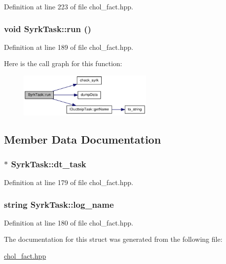 Definition at line 223 of file chol\_\-fact.hpp.\hypertarget{struct_syrk_task_af42d38cd71c443635346e4280b28c8c7}{
\subsubsection[{run}]{\setlength{\rightskip}{0pt plus 5cm}void SyrkTask::run ()}}
\label{struct_syrk_task_af42d38cd71c443635346e4280b28c8c7}


Definition at line 189 of file chol\_\-fact.hpp.

Here is the call graph for this function:\nopagebreak
\begin{figure}[H]
\begin{center}
\leavevmode
\includegraphics[width=186pt]{struct_syrk_task_af42d38cd71c443635346e4280b28c8c7_cgraph}
\end{center}
\end{figure}


\subsection{Member Data Documentation}
\hypertarget{struct_syrk_task_aea7818766634413ae5832d5809789dc4}{
\subsubsection[{dt\_\-task}]{$\ast$ {\bf SyrkTask::dt\_\-task}}}
\label{struct_syrk_task_aea7818766634413ae5832d5809789dc4}


Definition at line 179 of file chol\_\-fact.hpp.\hypertarget{struct_syrk_task_a9a6506fac25b5de8f9da7d65c6404879}{
\subsubsection[{log\_\-name}]{\setlength{\rightskip}{0pt plus 5cm}string {\bf SyrkTask::log\_\-name}}}
\label{struct_syrk_task_a9a6506fac25b5de8f9da7d65c6404879}


Definition at line 180 of file chol\_\-fact.hpp.

The documentation for this struct was generated from the following file:\begin{DoxyCompactItemize}
\item 
\hyperlink{chol__fact_8hpp}{chol\_\-fact.hpp}\end{DoxyCompactItemize}
